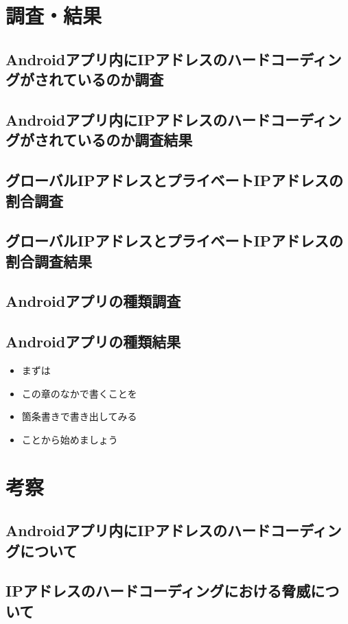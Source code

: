 \documentclass[a4j]{jarticle}
\begin{document}
\newpage

\section{調査・結果}
\subsection{Androidアプリ内にIPアドレスのハードコーディングがされているのか調査}
\subsection{Androidアプリ内にIPアドレスのハードコーディングがされているのか調査結果}
\subsection{グローバルIPアドレスとプライベートIPアドレスの割合調査}
\subsection{グローバルIPアドレスとプライベートIPアドレスの割合調査結果}
\subsection{Androidアプリの種類調査}
\subsection{Androidアプリの種類結果}
\begin{itemize}
\item まずは
\item この章のなかで書くことを
\item 箇条書きで書き出してみる
\item ことから始めましょう
\end{itemize}

\newpage
\section{考察}
\subsection{Androidアプリ内にIPアドレスのハードコーディングについて}
\subsection{IPアドレスのハードコーディングにおける脅威について}
\end{document}
